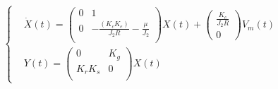 \begin{align}
\label{EE2}
\left\lbrace
\begin{aligned}
&\dot{X}(t) 
=
 \begin{pmatrix}
0 &	1 \\
0	&	-\frac{(K_c K_e)}{J_2 R}-\frac{\mu}{J_2}\\
\end{pmatrix}X(t)
+
\begin{pmatrix}
\frac{K_c}{J_2 R}\\
0
\end{pmatrix} 
V_m(t)\\
&Y(t) = \begin{pmatrix}
0	&	K_g	\\
K_rK_s	&	0	\\
\end{pmatrix}X(t)
\end{aligned}
\right.
\end{align}

